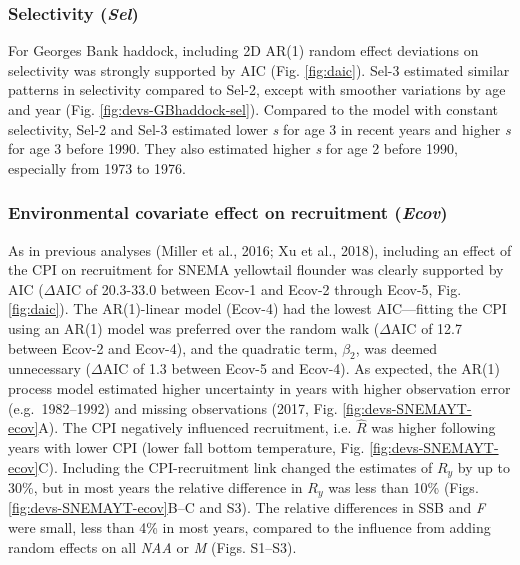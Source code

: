 \documentclass[]{article}
\begin{document}
\hypertarget{selectivity-sel-1}{%
\subsubsection{\texorpdfstring{Selectivity
(\emph{Sel})}{Selectivity (Sel)}}\label{selectivity-sel-1}}

For Georges Bank haddock, including 2D AR(1) random effect deviations on
selectivity was strongly supported by AIC (Fig. \ref{fig:daic}). Sel-3
estimated similar patterns in selectivity compared to Sel-2, except with
smoother variations by age and year (Fig. \ref{fig:devs-GBhaddock-sel}).
Compared to the model with constant selectivity, Sel-2 and Sel-3
estimated lower \emph{s} for age 3 in recent years and higher \emph{s}
for age 3 before 1990. They also estimated higher \emph{s} for age 2
before 1990, especially from 1973 to 1976.

\hypertarget{environmental-covariate-effect-on-recruitment-ecov}{%
\subsubsection{\texorpdfstring{Environmental covariate effect on
recruitment
(\emph{Ecov})}{Environmental covariate effect on recruitment (Ecov)}}\label{environmental-covariate-effect-on-recruitment-ecov}}

As in previous analyses (Miller et al., 2016; Xu et al., 2018),
including an effect of the CPI on recruitment for SNEMA yellowtail
flounder was clearly supported by AIC (\(\Delta \text{AIC}\) of
20.3-33.0 between Ecov-1 and Ecov-2 through Ecov-5, Fig.
\ref{fig:daic}). The AR(1)-linear model (Ecov-4) had the lowest
AIC---fitting the CPI using an AR(1) model was preferred over the random
walk (\(\Delta \text{AIC}\) of 12.7 between Ecov-2 and Ecov-4), and the
quadratic term, \(\beta_2\), was deemed unnecessary
(\(\Delta \text{AIC}\) of 1.3 between Ecov-5 and Ecov-4). As expected,
the AR(1) process model estimated higher uncertainty in years with
higher observation error (e.g.~1982--1992) and missing observations
(2017, Fig. \ref{fig:devs-SNEMAYT-ecov}A). The CPI negatively influenced
recruitment, i.e. \(\hat{R}\) was higher following years with lower CPI
(lower fall bottom temperature, Fig. \ref{fig:devs-SNEMAYT-ecov}C).
Including the CPI-recruitment link changed the estimates of \(R_y\) by
up to 30\%, but in most years the relative difference in \(R_y\) was
less than 10\% (Figs. \ref{fig:devs-SNEMAYT-ecov}B--C and S3). The
relative differences in SSB and \emph{F} were small, less than 4\% in
most years, compared to the influence from adding random effects on all
\emph{NAA} or \emph{M} (Figs. S1--S3).
\end{document}
